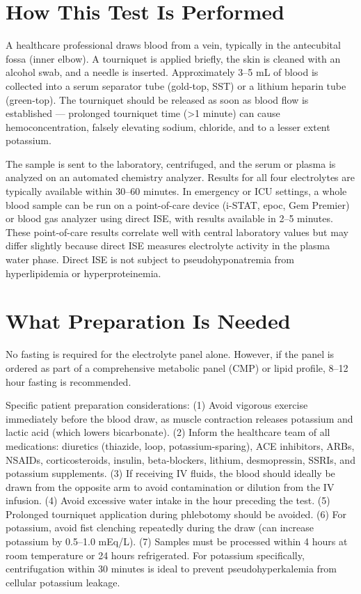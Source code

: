 \section*{How This Test Is Performed}
A healthcare professional draws blood from a vein, typically in the antecubital fossa (inner elbow). A tourniquet is applied briefly, the skin is cleaned with an alcohol swab, and a needle is inserted. Approximately 3--5 mL of blood is collected into a serum separator tube (gold-top, SST) or a lithium heparin tube (green-top). The tourniquet should be released as soon as blood flow is established --- prolonged tourniquet time (>1 minute) can cause hemoconcentration, falsely elevating sodium, chloride, and to a lesser extent potassium.

The sample is sent to the laboratory, centrifuged, and the serum or plasma is analyzed on an automated chemistry analyzer. Results for all four electrolytes are typically available within 30--60 minutes. In emergency or ICU settings, a whole blood sample can be run on a point-of-care device (i-STAT, epoc, Gem Premier) or blood gas analyzer using direct ISE, with results available in 2--5 minutes. These point-of-care results correlate well with central laboratory values but may differ slightly because direct ISE measures electrolyte activity in the plasma water phase. Direct ISE is not subject to pseudohyponatremia from hyperlipidemia or hyperproteinemia.

\section*{What Preparation Is Needed}
No fasting is required for the electrolyte panel alone. However, if the panel is ordered as part of a comprehensive metabolic panel (CMP) or lipid profile, 8--12 hour fasting is recommended.

Specific patient preparation considerations: (1) Avoid vigorous exercise immediately before the blood draw, as muscle contraction releases potassium and lactic acid (which lowers bicarbonate). (2) Inform the healthcare team of all medications: diuretics (thiazide, loop, potassium-sparing), ACE inhibitors, ARBs, NSAIDs, corticosteroids, insulin, beta-blockers, lithium, desmopressin, SSRIs, and potassium supplements. (3) If receiving IV fluids, the blood should ideally be drawn from the opposite arm to avoid contamination or dilution from the IV infusion. (4) Avoid excessive water intake in the hour preceding the test. (5) Prolonged tourniquet application during phlebotomy should be avoided. (6) For potassium, avoid fist clenching repeatedly during the draw (can increase potassium by 0.5--1.0 mEq/L). (7) Samples must be processed within 4 hours at room temperature or 24 hours refrigerated. For potassium specifically, centrifugation within 30 minutes is ideal to prevent pseudohyperkalemia from cellular potassium leakage.

